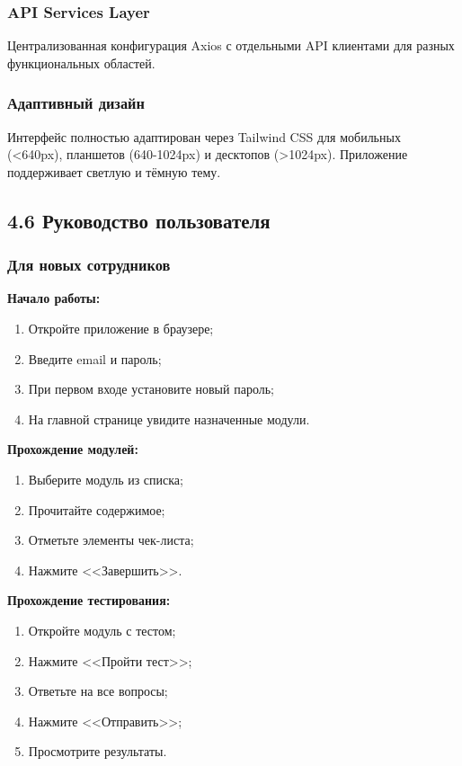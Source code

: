 \subsubsection{API Services Layer}

Централизованная конфигурация Axios с отдельными API клиентами для разных функциональных областей.

\subsubsection{Адаптивный дизайн}

Интерфейс полностью адаптирован через Tailwind CSS для мобильных (<640px), планшетов (640-1024px) и десктопов (>1024px). Приложение поддерживает светлую и тёмную тему.


\subsection{4.6 Руководство пользователя}

\subsubsection{Для новых сотрудников}

\textbf{Начало работы:}
\begin{enumerate}
    \item Откройте приложение в браузере;
    \item Введите email и пароль;
    \item При первом входе установите новый пароль;
    \item На главной странице увидите назначенные модули.
\end{enumerate}

\textbf{Прохождение модулей:}
\begin{enumerate}
    \item Выберите модуль из списка;
    \item Прочитайте содержимое;
    \item Отметьте элементы чек-листа;
    \item Нажмите <<Завершить>>.
\end{enumerate}

\textbf{Прохождение тестирования:}
\begin{enumerate}
    \item Откройте модуль с тестом;
    \item Нажмите <<Пройти тест>>;
    \item Ответьте на все вопросы;
    \item Нажмите <<Отправить>>;
    \item Просмотрите результаты.
\end{enumerate}

